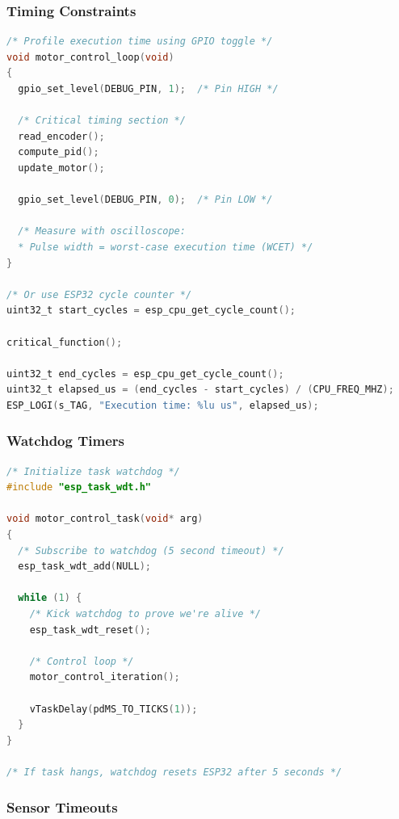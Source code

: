 \subsubsection{Timing Constraints}

\begin{lstlisting}[language=C]
/* Profile execution time using GPIO toggle */
void motor_control_loop(void)
{
  gpio_set_level(DEBUG_PIN, 1);  /* Pin HIGH */
  
  /* Critical timing section */
  read_encoder();
  compute_pid();
  update_motor();
  
  gpio_set_level(DEBUG_PIN, 0);  /* Pin LOW */
  
  /* Measure with oscilloscope:
  * Pulse width = worst-case execution time (WCET) */
}

/* Or use ESP32 cycle counter */
uint32_t start_cycles = esp_cpu_get_cycle_count();

critical_function();

uint32_t end_cycles = esp_cpu_get_cycle_count();
uint32_t elapsed_us = (end_cycles - start_cycles) / (CPU_FREQ_MHZ);
ESP_LOGI(s_TAG, "Execution time: %lu us", elapsed_us);


\end{lstlisting}
\subsubsection{Watchdog Timers}

\begin{lstlisting}[language=C]
/* Initialize task watchdog */
#include "esp_task_wdt.h"

void motor_control_task(void* arg)
{
  /* Subscribe to watchdog (5 second timeout) */
  esp_task_wdt_add(NULL);
  
  while (1) {
    /* Kick watchdog to prove we're alive */
    esp_task_wdt_reset();
    
    /* Control loop */
    motor_control_iteration();
    
    vTaskDelay(pdMS_TO_TICKS(1));
  }
}

/* If task hangs, watchdog resets ESP32 after 5 seconds */


\end{lstlisting}
\subsubsection{Sensor Timeouts}

